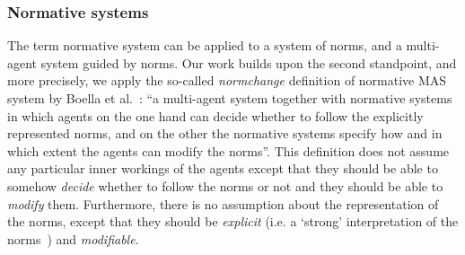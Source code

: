 %

\subsubsection{Normative systems}
%
The term normative system can be applied to a system of norms, and a multi-agent system guided by norms. Our work builds upon the second standpoint, and more precisely, we apply the so-called \textit{normchange} definition of normative MAS system by Boella et al.~\cite{Boella2006IntroductionSystems}: %
``a multi-agent system together with normative systems in which agents on the one hand can decide whether to follow the explicitly represented norms, and on the other the normative systems specify how and in which extent the agents can modify the norms''.
%
This definition does not assume any particular inner workings of the agents except that they should be able to somehow \textit{decide} whether to follow the norms or not and they should be able to \textit{modify} them.
%
Furthermore, there is no assumption about the representation of the norms, except that they should be \textit{explicit} (i.e. a `strong' interpretation of the norms~\cite{Boella2009NormativeSystems}) and \textit{modifiable}. 
%




